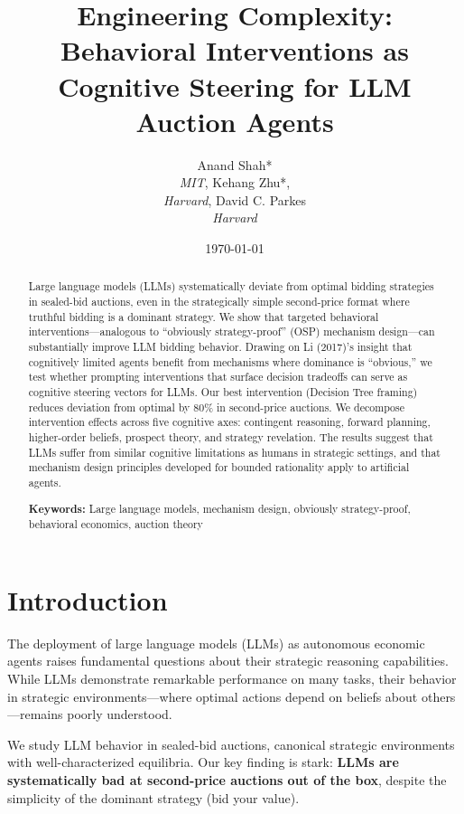 \documentclass[12pt]{article}
\title{Engineering Complexity: \\
\large Behavioral Interventions as Cognitive Steering for LLM Auction Agents}
\author{
Anand Shah*\\
\textit{MIT},
Kehang Zhu*,\\
\textit{Harvard},
David C. Parkes\\
\textit{Harvard}
}
\date{\today}
\begin{document}
\maketitle

\begin{abstract}
Large language models (LLMs) systematically deviate from optimal bidding strategies in sealed-bid auctions, even in the strategically simple second-price format where truthful bidding is a dominant strategy. We show that targeted behavioral interventions---analogous to ``obviously strategy-proof'' (OSP) mechanism design---can substantially improve LLM bidding behavior. Drawing on Li (2017)'s insight that cognitively limited agents benefit from mechanisms where dominance is ``obvious,'' we test whether prompting interventions that surface decision tradeoffs can serve as cognitive steering vectors for LLMs. Our best intervention (Decision Tree framing) reduces deviation from optimal by 80\% in second-price auctions. We decompose intervention effects across five cognitive axes: contingent reasoning, forward planning, higher-order beliefs, prospect theory, and strategy revelation. The results suggest that LLMs suffer from similar cognitive limitations as humans in strategic settings, and that mechanism design principles developed for bounded rationality apply to artificial agents.

\medskip
\noindent\textbf{Keywords:} Large language models, mechanism design, obviously strategy-proof, behavioral economics, auction theory
\end{abstract}

\section{Introduction}

The deployment of large language models (LLMs) as autonomous economic agents raises fundamental questions about their strategic reasoning capabilities. While LLMs demonstrate remarkable performance on many tasks, their behavior in strategic environments---where optimal actions depend on beliefs about others---remains poorly understood.

We study LLM behavior in sealed-bid auctions, canonical strategic environments with well-characterized equilibria. Our key finding is stark: \textbf{LLMs are systematically bad at second-price auctions out of the box}, despite the simplicity of the dominant strategy (bid your value).
\end{document}

